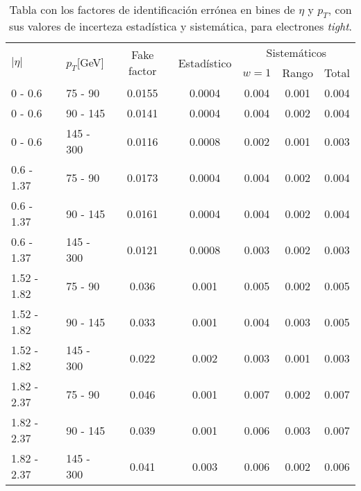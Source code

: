 \begin{table}	
\centering
\caption{Tabla con los factores de identificación errónea en bines de $\eta$ y $p_{T}$, con sus valores de incerteza estadística y sistemática, para electrones \textit{tight}.}
\begin{threeparttable}
\begin{tabular}{ l l c c c c c }

	\hline
	\hline

	\multirow{2}{*}{$|\eta|$} & \multirow{2}{*}{$p_{T}$[GeV]} & \multirow{2}{*}{Fake factor} & \multirow{2}{*}{Estadístico} & \multicolumn{3}{c}{Sistemáticos} \\
	
	\cline{5-7}

	 & & & & $w=1$ & Rango & Total \\

	\hline

	0 - 0.6 	& 75 - 90 	& 0.0155 & 0.0004 & 0.004	&  0.001	&  0.004  \\

	0 - 0.6 	& 90 - 145 	& 0.0141 & 0.0004 & 0.004	&  0.002	&  0.004  \\

	0 - 0.6 	& 145 - 300 & 0.0116 & 0.0008 & 0.002	&  0.001	&  0.003  \\

	\hline

	0.6 - 1.37 	& 75 - 90 	& 0.0173 & 0.0004 & 0.004	&  0.002	&  0.004  \\

	0.6 - 1.37 	& 90 - 145 	& 0.0161 & 0.0004 & 0.004	&  0.002	&  0.004  \\

	0.6 - 1.37 	& 145 - 300 & 0.0121 & 0.0008 & 0.003	&  0.002	&  0.003  \\

	\hline

	1.52 - 1.82 & 75 - 90 	& 0.036  & 0.001 & 0.005	&  0.002	&  0.005 \\

	1.52 - 1.82 & 90 - 145 	& 0.033  & 0.001 & 0.004	&  0.003	&  0.005  \\

	1.52 - 1.82 & 145 - 300 & 0.022  & 0.002 & 0.003	&  0.001	&  0.003  \\

	\hline

	1.82 - 2.37 & 75 - 90 	& 0.046		& 0.001 & 0.007	&  0.002	&  0.007  \\

	1.82 - 2.37 & 90 - 145	& 0.039		& 0.001 & 0.006	&  0.003	&  0.007  \\

	1.82 - 2.37 & 145 - 300 & 0.041		& 0.003 & 0.006	&  0.002	&  0.006  \\

	\hline
	\hline

\end{tabular}
\end{threeparttable}
\label{ta:fftable_tight}
\end{table}

